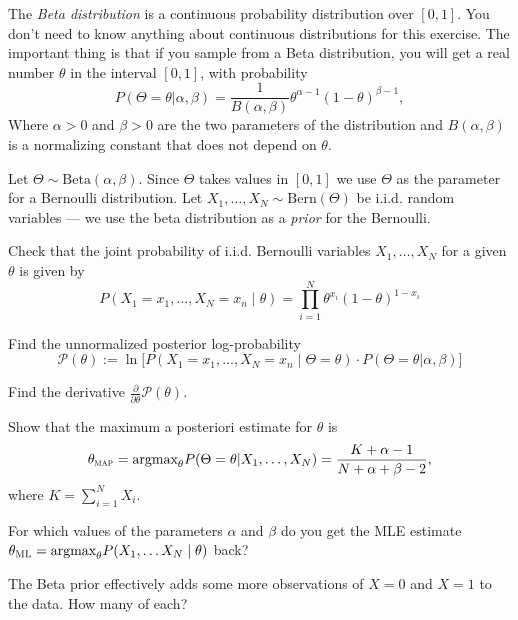 \documentclass[a4paper,10pt,landscape,twocolumn]{scrartcl}
\begin{document}
\begin{exercise}
  The \emph{Beta distribution} is a continuous probability distribution over
  $[0,1]$. You don't need to know anything about continuous distributions for
  this exercise. The important thing is that if you sample from a Beta
  distribution, you will get a real number $\theta$ in the interval $[0, 1]$,
  with probability
  \[
    P(\Theta = \theta|\alpha, \beta) 
      = \frac{1}{B(\alpha, \beta)} \theta^{\alpha-1} (1-\theta)^{\beta-1},
  \] 
  Where $\alpha > 0$ and $\beta > 0$ are the two parameters of the distribution
  and $B(\alpha, \beta)$ is a normalizing constant that does not depend on
  $\theta$.

  Let $\Theta \sim \text{Beta}(\alpha, \beta)$. Since $\Theta$ takes values in
  $[0,1]$ we use $\Theta$ as the parameter for a Bernoulli distribution. Let
  $X_1, \dots, X_N \sim \text{Bern}(\Theta)$ be i.i.d. random variables --- we
  use the beta distribution as a \emph{prior} for the Bernoulli.
	
  \begin{subex}
    Check that the joint probability of i.i.d. Bernoulli variables 
    $X_1, \dots, X_N$ for a given $\theta$ is given by
	\[
      P(X_1=x_1, \dots, X_N=x_n \mid \theta) 
        = \prod_{i=1}^N \theta^{x_i} (1-\theta)^{1-x_i}
	\]	
  \end{subex}

  \begin{subex}
    Find the unnormalized posterior log-probability 
    \[
      \mathcal P(\theta) 
        := \ln \bigl[ P(X_1=x_1, \dots, X_N=x_n \mid \Theta=\theta)
            \cdot P(\Theta = \theta| \alpha, \beta)\bigr]
    \]
  \end{subex}
  
  \begin{subex}
    Find the derivative $\frac{\partial}{\partial \theta} \mathcal P(\theta)$.	
  \end{subex}
  
  \begin{subex}
    Show that the maximum a posteriori estimate for $\theta$ is 
    \[
      \theta_\textsc{map} 
        = \text{argmax}_\theta P(\Theta = \theta | X_1, \dots, X_N)
        = \frac{K + \alpha - 1}{N + \alpha + \beta - 2}, 
    \]
    where $K = \sum_{i=1}^N X_i$.
  \end{subex}
  
  \begin{subex}
    For which values of the parameters $\alpha$ and $\beta$ do you get the MLE
    estimate $\theta_\textsc{ML} = \text{argmax}_\theta P(X_1, \dots X_N \mid
    \theta)$ back?
  \end{subex}
  
  \begin{subex}
    The Beta prior effectively adds some more observations of $X=0$ and $X=1$
    to the data. How many of each?
  \end{subex}
\end{exercise}
\end{document}
